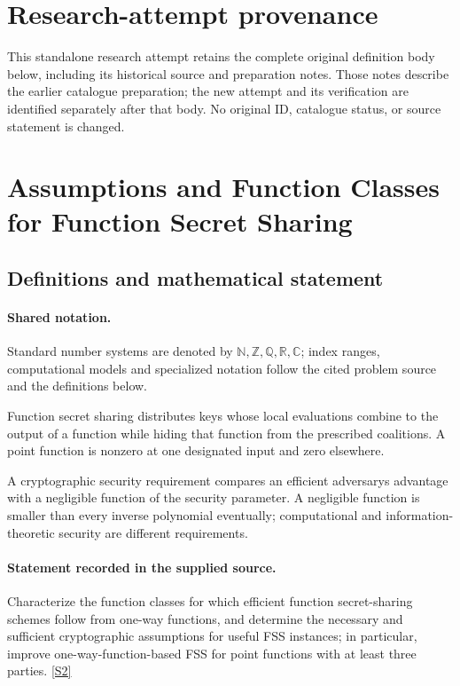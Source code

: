 \documentclass[11pt]{article}
\begin{document}
\section*{Research-attempt provenance}
This standalone research attempt retains the complete original definition body below,
including its historical source and preparation notes. Those notes describe the
earlier catalogue preparation; the new attempt and its verification are identified
separately after that body. No original ID, catalogue status, or source statement is changed.

\section{Assumptions and Function Classes for Function Secret Sharing}\label{statement}

\subsection{Definitions and mathematical statement}

\paragraph{Shared notation.}Standard number systems are denoted by $\mathbb N,\mathbb Z,\mathbb Q,\mathbb R,\mathbb C$; index ranges, computational models and specialized notation follow the cited problem source and the definitions below.


Function secret sharing distributes keys whose local evaluations combine to the output of a function while hiding that function from the prescribed coalitions. A point function is nonzero at one designated input and zero elsewhere.

A cryptographic security requirement compares an efficient adversary\textquotesingle s advantage with a negligible function of the security parameter. A negligible function is smaller than every inverse polynomial eventually; computational and information-theoretic security are different requirements.
\paragraph{Statement recorded in the supplied source.}
Characterize the function classes for which efficient function secret-sharing schemes follow from one-way functions, and determine the necessary and sufficient cryptographic assumptions for useful FSS instances; in particular, improve one-way-function-based FSS for point functions with at least three parties. \href{https://doi.org/10.4171/owr/2017/5}{[S2]}
\end{document}
